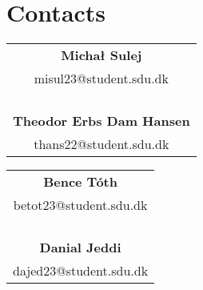 \section*{Contacts}
\vspace{1cm}
\begin{tabular}[h]{c}
     \textbf{Michał Sulej}   \\
     misul23@student.sdu.dk  \\
     \\
     \\
     \\
     \\
    \textbf{Theodor Erbs Dam Hansen}  \\
    thans22@student.sdu.dk            \\
\end{tabular}
\hfill
\begin{tabular}[h]{c}
     \textbf{Bence Tóth}    \\
     betot23@student.sdu.dk \\
     \\
     \\
     \\
     \\
     \textbf{Danial Jeddi}  \\
     dajed23@student.sdu.dk \\
\end{tabular}